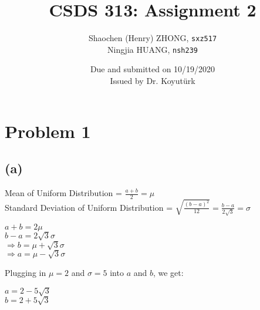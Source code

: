 \documentclass[12pt]{article}
\newcommand{\ilc}{\texttt}
\begin{document}
\title{\textbf{CSDS 313: Assignment 2}}

\author{Shaochen (Henry) ZHONG, \ilc{sxz517} \\Ningjia HUANG, \ilc{nsh239}}
\date{Due and submitted on 10/19/2020 \\ Issued by Dr. Koyut{\"u}rk}
\maketitle



\section*{Problem 1}
\subsection*{(a)}
Mean of Uniform Distribution = $\frac{a + b}{2} = \mu$ \\
Standard Deviation of Uniform Distribution = $\sqrt{\frac{(b-a)^2}{12}} = \frac{b-a}{2\sqrt{3}} = \sigma$ \\
\begin{center}
    $a + b = 2\mu$ \\
    $b - a = 2\sqrt{3} \sigma$ \\
    $\Rightarrow b = \mu + \sqrt{3} \sigma$ \\
    $\Rightarrow a = \mu - \sqrt{3} \sigma$
\end{center}
Plugging in $\mu = 2$ and $\sigma = 5$ into $a$ and $b$, we get:
\begin{center}
    $a = 2 - 5\sqrt{3}$\\
    $b = 2 + 5\sqrt{3}$
\end{center}
\end{document}

